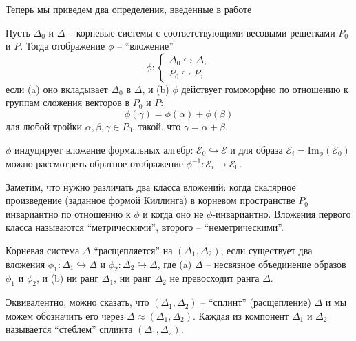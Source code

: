 Теперь мы приведем два определения, введенные в работе \cite{richter2008splints}

\begin{Def}
Пусть $\Delta _{0}$ и $\Delta$ -- корневые системы с соответствующими весовыми решетками $P_{0}$ и $P$. Тогда отображение $\phi $ -- ``вложение''
\begin{equation}
\phi :\left\{
\begin{array}{l}
\Delta _{0}\hookrightarrow \Delta , \\
P_{0}\hookrightarrow P,
\end{array}
\right.
\end{equation}
если \newline
\noindent (a) оно вкладывает $\Delta _{0}$ в $\Delta $, и \newline
\noindent (b) $\phi$ действует гомоморфно по отношению к группам сложения векторов в $P_{0}$ и $P$:
\[
\phi (\gamma )=\phi (\alpha )+\phi (\beta )
\]
для любой тройки $\alpha ,\beta ,\gamma \in P_{0}$, такой, что $\gamma =\alpha+\beta $.
\end{Def}

$\phi$ индуцирует вложение формальных алгебр: ${\mathcal{E}}_0\hookrightarrow \mathcal{E}$ и для образа ${\mathcal{E}}_i=\mathrm{Im}_{\phi}\left( {\mathcal{E}}_0\right)$ можно рассмотреть обратное отображение $\phi^{-1}:{\mathcal{E}}_i \longrightarrow {\mathcal{E}}_0$.

Заметим, что нужно различать два класса вложений: когда скалярное произведение (заданное формой Киллинга) в корневом пространстве $P_0$ инвариантно по отношению к  $\phi$ и когда оно не  $\phi$-инвариантно. Вложения первого класса называются ``метрическими'', второго -- ``неметрическими''. 

\begin{Def}
Корневая система $\Delta$ ``расщепляется'' на  $(\Delta _{1},\Delta _{2})$, если существует два вложения  $\phi _{1}:\Delta _{1}\hookrightarrow \Delta $ и $\phi _{2}:\Delta _{2}\hookrightarrow \Delta $, где (a) $\Delta $ -- несвязное объединение образов $\phi _{1}$ и $\phi _{2}$, и (b) ни ранг  $\Delta _{1}$, ни ранг  $\Delta _{2}$ не превосходит ранга $\Delta $.
\end{Def}

Эквивалентно, можно сказать, что  $(\Delta_1,\Delta_2)$  -- ``сплинт'' (расщепление)  $\Delta$ и мы можем обозначить его через $\Delta \approx (\Delta_1,\Delta_2)$. Каждая из компонент  $\Delta_1$ и $\Delta_2$ называется ``стеблем'' сплинта $(\Delta_1,\Delta_2)$.

